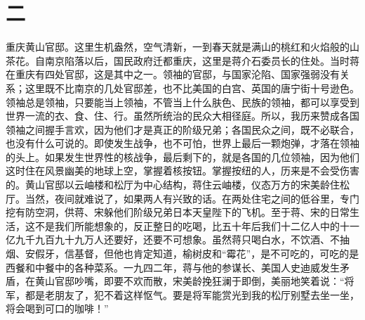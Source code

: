 \fancyhead[RO]{\thepage} %
\fancyhead[LE]{\thepage} %
\fancyfoot[LE,RO]{}
\fancyfoot[LO,CE]{}
\fancyfoot[CO,RE]{}
\chapter*{二}
重庆黄山官邸。这里生机盎然，空气清新，一到春天就是满山的桃红和火焰般的山茶花。自南京陷落以后，国民政府迁都重庆，这里是蒋介石委员长的住处。当时蒋在重庆有四处官邸，这是其中之一。领袖的官邸，与国家沦陷、国家强弱没有关系；这里既不比南京的几处官邸差，也不比美国的白宫、英国的唐宁街十号逊色。领袖总是领袖，只要能当上领袖，不管当上什么肤色、民族的领袖，都可以享受到世界一流的衣、食、住、行。虽然所统治的民众大相径庭。所以，我历来赞成各国领袖之间握手言欢，因为他们才是真正的阶级兄弟；各国民众之间，既不必联合，也没有什么可说的。即使发生战争，也不可怕，世界上最后一颗炮弹，才落在领袖的头上。如果发生世界性的核战争，最后剩下的，就是各国的几位领袖，因为他们这时住在风景幽美的地球上空，掌握着核按钮。掌握按纽的人，历来是不会受伤害的。黄山官邸以云岫楼和松厅为中心结构，蒋住云岫楼，仪态万方的宋美龄住松厅。当然，夜间就难说了，如果两人有兴致的话。在两处住宅之间的低谷里，专门挖有防空洞，供蒋、宋躲他们阶级兄弟日本天皇陛下的飞机。至于蒋、宋的日常生活，这不是我们所能想象的，反正整日的吃喝，比五十年后我们十二亿人中的十一亿九千九百九十九万人还要好，还要不可想象。虽然蒋只喝白水，不饮酒、不抽烟、安假牙，信基督，但他也肯定知道，榆树皮和“霉花”，是不可吃的，可吃的是西餐和中餐中的各种菜系。一九四二年，蒋与他的参谋长、美国人史迪威发生矛盾，在黄山官邸吵嘴，即要不欢而散，宋美龄挽狂澜于即倒，美丽地笑着说：“将军，都是老朋友了，犯不着这样怄气。要是将军能赏光到我的松厅别墅去坐一坐，将会喝到可口的咖啡！”\\


